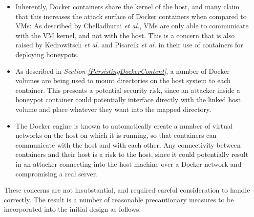 \begin{itemize}
\item Inherently, Docker containers share the kernel of the host, and many claim that this increases the attack surface of Docker containers when compared to VMs: As described by Chelladhurai \textit{et al.}, VMs are only able to communicate with the VM kernel, and not with the host. \cite{Chelladhurai2016} This is a concern that is also raised by Kedrowitsch \textit{et al.} and Pisarcik \textit{et al.} in their use of containers for deploying honeypots. \cite{LXCsForDeceptiveHoneypots2017} \cite{Pisarcik:2014:FDV:2659651.2659685}
\item As described in \textit{Section \ref{PersistingDockerContent}}, a number of Docker volumes are being used to mount directories on the host system to each container. This presents a potential security risk, since an attacker inside a honeypot container could potentially interface directly with the linked host volume and place whatever they want into the mapped directory.
\item The Docker engine is known to automatically create a number of virtual networks on the host on which it is running, so that containers can communicate with the host and with each other. Any connectivity between containers and their host is a risk to the host, since it could potentially result in an attacker connecting into the host machine over a Docker network and compromising a real server.
\end{itemize}

These concerns are not insubstantial, and required careful consideration to handle correctly. The result is a number of reasonable precautionary measures to be incorporated into the initial design as follows:

